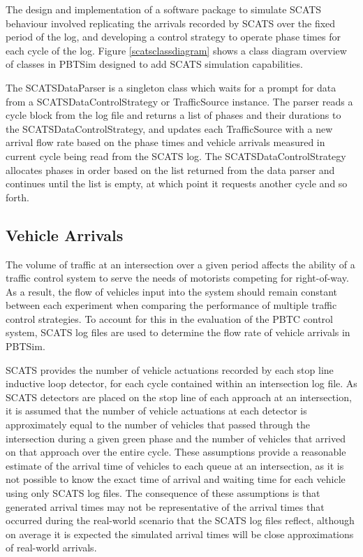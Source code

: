 The design and implementation of a software package to simulate SCATS behaviour involved replicating the arrivals recorded by SCATS over the fixed period of the log, and developing a control strategy to operate phase times for each cycle of the log. Figure \ref{scatsclassdiagram} shows a class diagram overview of classes in PBTSim designed to add SCATS simulation capabilities. 

The SCATSDataParser is a singleton class which waits for a prompt for data from a SCATSDataControlStrategy or TrafficSource instance. The parser reads a cycle block from the log file and returns a list of phases and their durations to the SCATSDataControlStrategy, and updates each TrafficSource with a new arrival flow rate based on the phase times and vehicle arrivals measured in current cycle being read from the SCATS log. The SCATSDataControlStrategy allocates phases in order based on the list returned from the data parser and continues until the list is empty, at which point it requests another cycle and so forth.

\subsection{Vehicle Arrivals}

The volume of traffic at an intersection over a given period affects the ability of a traffic control system to serve the needs of motorists competing for right-of-way. As a result, the flow of vehicles input into the system should remain constant between each experiment when comparing the performance of multiple traffic control strategies. To account for this in the evaluation of the PBTC control system, SCATS log files are used to determine the flow rate of vehicle arrivals in PBTSim. 

SCATS provides the number of vehicle actuations recorded by each stop line inductive loop detector, for each cycle contained within an intersection log file. As SCATS detectors are placed on the stop line of each approach at an intersection, it is assumed that the number of vehicle actuations at each detector is approximately equal to the number of vehicles that passed through the intersection during a given green phase and the number of vehicles that arrived on that approach over the entire cycle. These assumptions provide a reasonable estimate of the arrival time of vehicles to each queue at an intersection, as it is not possible to know the exact time of arrival and waiting time for each vehicle using only SCATS log files. The consequence of these assumptions is that generated arrival times may not be representative of the arrival times that occurred during the real-world scenario that the SCATS log files reflect, although on average it is expected the simulated arrival times will be close approximations of real-world arrivals. 

